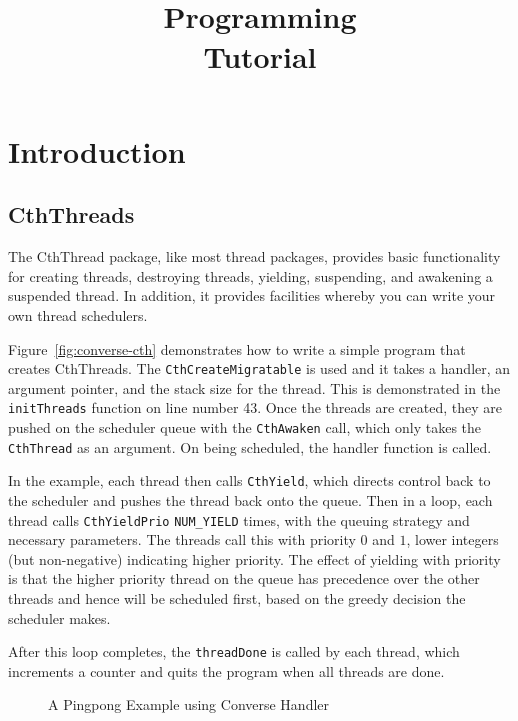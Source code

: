 \documentclass[10pt]{report}
\title{\converse{}\\Programming\\Tutorial}
\begin{document}
\maketitle

\chapter{Introduction}

\section{CthThreads}

The CthThread package, like most thread packages, provides basic functionality
for creating threads, destroying threads, yielding, suspending, and awakening a
suspended thread. In addition, it provides facilities whereby you can write
your own thread schedulers.

Figure~\ref{fig:converse-cth} demonstrates how to write a simple program that
creates CthThreads. The \texttt{CthCreateMigratable} is used and it takes a
handler, an argument pointer, and the stack size for the thread. This is
demonstrated in the \texttt{initThreads} function on line number 43. Once the
threads are created, they are pushed on the scheduler queue with the
\texttt{CthAwaken} call, which only takes the \texttt{CthThread} as an
argument. On being scheduled, the handler function is called.

In the example, each thread then calls \texttt{CthYield}, which directs control
back to the scheduler and pushes the thread back onto the queue. Then in a
loop, each thread calls \texttt{CthYieldPrio} \texttt{NUM\_YIELD} times, with
the queuing strategy and necessary parameters. The threads call this with
priority $0$ and $1$, lower integers (but non-negative) indicating higher
priority. The effect of yielding with priority is that the higher priority
thread on the queue has precedence over the other threads and hence will be
scheduled first, based on the greedy decision the scheduler makes.

After this loop completes, the \texttt{threadDone} is called by each
thread, which increments a counter and quits the program when all threads are
done.

\begin{figure}

\caption{A Pingpong Example using Converse Handler}
\label{fig:converse-pingpong}
\end{figure}
\end{document}
